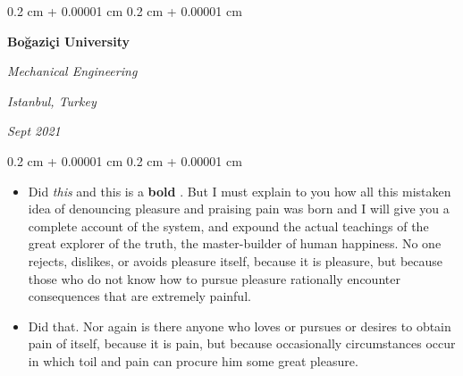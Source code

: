 \documentclass[10pt, letterpaper]{article}
\newenvironment{highlights}{
    \begin{itemize}[
        topsep=0.10 cm,
        parsep=0.10 cm,
        partopsep=0pt,
        itemsep=0pt,
        leftmargin=0.4 cm + 10pt
    ]
}{
    \end{itemize}
} %
\newenvironment{onecolentry}{
    \begin{adjustwidth}{
        0.2 cm + 0.00001 cm
    }{
        0.2 cm + 0.00001 cm
    }
}{
    \end{adjustwidth}
} %
\newenvironment{twocolentry}[2][]{
    \onecolentry
    \def\secondColumn{#2}
    \setcolumnwidth{\fill, 4.5 cm}
    \begin{paracol}{2}
}{
    \switchcolumn \raggedleft \secondColumn
    \end{paracol}
    \endonecolentry
} %
\let\hrefWithoutArrow\href
\renewcommand{\href}[2]{\hrefWithoutArrow{#1}{\ifthenelse{\equal{#2}{}}{ }{#2 }\raisebox{.15ex}{\footnotesize \faExternalLink*}}}
\begin{document}
        \vspace{0.2 cm}

        \begin{twocolentry}{
        \textit{Istanbul, Turkey}    
            
        \textit{Sept 2021}}
            \textbf{Boğaziçi University}

            \textit{Mechanical Engineering}
        \end{twocolentry}
        \vspace{0.10 cm}
        \begin{onecolentry}
            \begin{highlights}
                \item Did \textit{this} and this is a \textbf{bold} \href{https://example.com}{link}. But I must explain to you how all this mistaken idea of denouncing pleasure and praising pain was born and I will give you a complete account of the system, and expound the actual teachings of the great explorer of the truth, the master-builder of human happiness. No one rejects, dislikes, or avoids pleasure itself, because it is pleasure, but because those who do not know how to pursue pleasure rationally encounter consequences that are extremely painful.
                \item Did that. Nor again is there anyone who loves or pursues or desires to obtain pain of itself, because it is pain, but because occasionally circumstances occur in which toil and pain can procure him some great pleasure.
            \end{highlights}
        \end{onecolentry}


        \vspace{0.2 cm}
\end{document}
